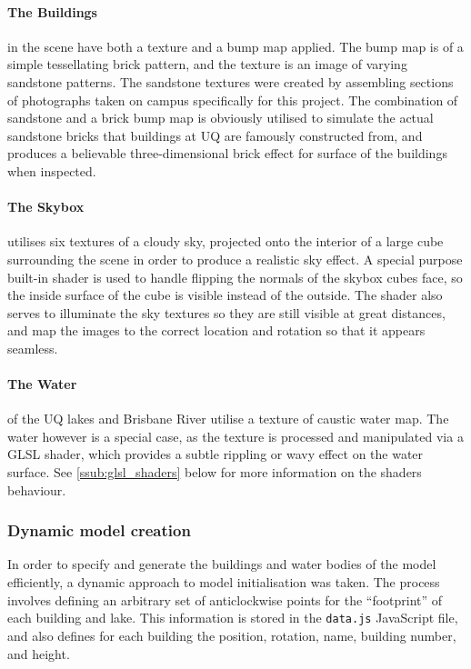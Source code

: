             \paragraph{The Buildings} %
            \label{par:the_buildings}
                in the scene have both a texture and a bump map applied.
                The bump map is of a simple tessellating brick pattern, and the texture is an image of varying sandstone patterns.
                The sandstone textures were created by assembling sections of photographs taken on campus specifically for this project.
                The combination of sandstone and a brick bump map is obviously utilised to simulate the actual sandstone bricks that buildings at UQ are famously constructed from, and produces a believable three-dimensional brick effect for surface of the buildings when inspected.

            \paragraph{The Skybox} %
            \label{par:the_skybox}
                utilises six textures of a cloudy sky, projected onto the interior of a large cube surrounding the scene in order to produce a realistic sky effect.
                A special purpose built-in shader is used to handle flipping the normals of the skybox cubes face, so the inside surface of the cube is visible instead of the outside.
                The shader also serves to illuminate the sky textures so they are still visible at great distances, and map the images to the correct location and rotation so that it appears seamless.

            \paragraph{The Water} %
            \label{par:the_water}
                of the UQ lakes and Brisbane River utilise a texture of caustic water map.
                The water however is a special case, as the texture is processed and manipulated via a GLSL shader, which provides a subtle rippling or wavy effect on the water surface.
                See \ref{ssub:glsl_shaders} below for more information on the shaders behaviour.

        \subsubsection{Dynamic model creation} %
        \label{ssub:dynamic_model_creation}
            In order to specify and generate the buildings and water bodies of the model efficiently, a dynamic approach to model initialisation was taken.
            The process involves defining an arbitrary set of anticlockwise points for the ``footprint'' of each building and lake.
            This information is stored in the \texttt{data.js} JavaScript file, and also defines for each building the position, rotation, name, building number, and height.\\

